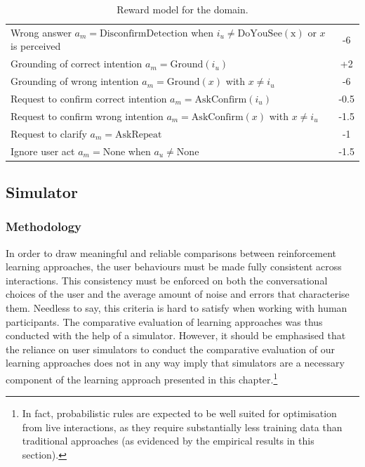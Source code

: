 \begin{table}[ht]
\begin{center}
\begin{footnotesize}
\begin{tabular}{p{130mm}c}
Wrong answer $a_m\!=\!\mathrm{DisconfirmDetection}$ when $i_u\!\neq\!\mathrm{DoYouSee(x)}$ or $x$ is perceived & -6 \\
Grounding of correct intention $a_m\!=\!\mathrm{Ground}(i_u)$ & +2 \\
Grounding of wrong intention  $a_m\!=\!\mathrm{Ground}(x)$ with $x\!\neq\!i_u$ & -6  \\ 
Request to confirm correct intention $a_m\!=\!\mathrm{AskConfirm}(i_u)$ & -0.5 \\
Request to confirm wrong intention  $a_m\!=\!\mathrm{AskConfirm}(x)$ with $x\!\neq\!i_u$ & -1.5  \\ 
Request to clarify $a_m\!=\!\mathrm{AskRepeat}$ & -1 \\
Ignore user act $a_m\!=\!\mathrm{None}$ when $a_u\!\neq\!\mathrm{None}$ & -1.5 
\end{tabular}
\end{footnotesize}
\end{center}  
\caption{Reward model for the domain.} 
\label{table:rewards}
\end{table}


\subsection{Simulator}

\subsubsection*{Methodology}

In order to draw meaningful and reliable comparisons between reinforcement learning approaches, the user behaviours must be made fully consistent across interactions.  This consistency must be enforced on both the conversational choices of the user and the average amount of noise and errors that characterise them. Needless to say, this criteria is hard to satisfy when working with human participants. The comparative evaluation of learning approaches was thus conducted with the help of a simulator. However, it should be emphasised that the reliance on user simulators to conduct the comparative evaluation of our learning approaches does not in any way imply that simulators are a necessary component of the learning approach presented in this chapter.\footnote{In fact, probabilistic rules are expected to be well suited for optimisation from live interactions, as they require substantially less training data than traditional approaches (as evidenced by the empirical results in this section).}

